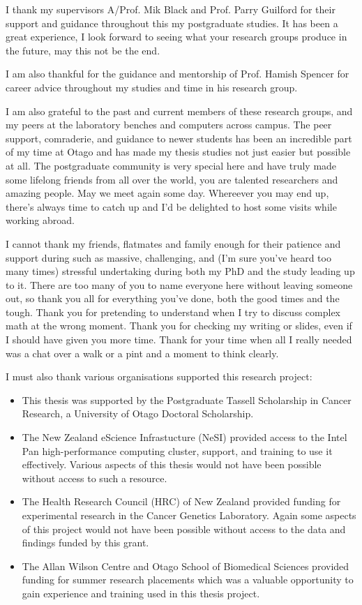 I thank my supervisors A/Prof. Mik Black and Prof. Parry Guilford for their support and guidance throughout this my postgraduate studies. It has been a great experience, I look forward to seeing what your research groups produce in the future, may this not be the end.

I am also thankful for the guidance and mentorship of Prof. Hamish Spencer for career advice throughout my studies and time in his research group.

I am also grateful to the past and current members of these research groups, and my peers at the laboratory benches and computers across campus. The peer support, comraderie, and guidance to newer students has been an incredible part of my time at Otago and has made my thesis studies not just easier but possible at all. The postgraduate community is very special here and have truly made some lifelong friends from all over the world, you are talented researchers and amazing people. May we meet again some day. Whereever you may end up, there's always time to catch up and I'd be delighted to host some visits while working abroad.

I cannot thank my friends, flatmates and family enough for their patience and support during such as massive, challenging, and (I'm sure you've heard too many times) stressful undertaking during both my PhD and the study leading up to it. There are too many of you to name everyone here without leaving someone out, so thank you all for everything you've done, both the good times and the tough. Thank you for pretending to understand when I try to discuss complex math at the wrong moment. Thank you for checking my writing or slides, even if I should have given you more time. Thank for your time when all I really needed was a chat over a walk or a pint and a moment to think clearly.

I must also thank various organisations supported this research project:

\begin{itemize}
\item
This thesis was supported by the Postgraduate Tassell Scholarship in Cancer Research, a University of Otago Doctoral Scholarship.

\item
The New Zealand eScience Infrastucture (NeSI) provided access to the Intel Pan high-performance computing cluster, support, and training to use it effectively. Various aspects of this thesis would not have been possible without access to such a resource. 

\item
The Health Research Council (HRC) of New Zealand provided funding for experimental research in the Cancer Genetics Laboratory. Again some aspects of this project would not have been possible without access to the data and findings funded by this grant.

\item
The Allan Wilson Centre and Otago School of Biomedical Sciences provided funding for summer research placements which was a valuable opportunity to gain experience and training used in this thesis project.

\end{itemize}

